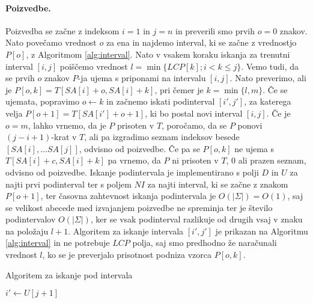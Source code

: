 \paragraph{Poizvedbe.}
Poizvedba se začne z indeksom $i=1$ in $j=n$ in preverili smo prvih $o=0$ znakov. Nato povečamo vrednost $o$ za ena in najdemo interval, ki se začne z vrednostjo $P[o]$, z Algoritmom \ref{alg:interval}. Nato v vsakem koraku iskanja za trenutni interval $[i,j]$ poiščemo vrednost $l=\min\{LCP[k];i<k\le j\}$. Vemo tudi, da se prvih $o$ znakov $P$-ja ujema s priponami na intervalu $[i,j]$. Nato preverimo, ali je $P[o,k]=T[SA[i]+o,SA[i]+k]$, pri čemer je $k=\min\{l,m\}$. Če se ujemata, popravimo $o\leftarrow k$ in začnemo iskati podinterval $[i',j']$, za katerega velja $P[o+1]=T[SA[i']+o+1]$, ki bo postal novi interval $[i,j]$. Če je $o=m$, lahko vrnemo, da je $P$ prisoten v $T$, poročamo, da se $P$ ponovi $(j-i+1)$-krat v $T$, ali pa izgradimo seznam indeksov besede $[SA[i],\dots SA[j]]$, odvisno od poizvedbe. Če pa se $P[o,k]$ ne ujema s $T[SA[i]+c,SA[i]+k]$ pa vrnemo, da $P$ ni prisoten v $T$, 0 ali prazen seznam, odvisno od poizvedbe. Iskanje podintervala je implementirano s polji $D$ in $U$ za najti prvi podinterval ter s poljem $NI$ za najti interval, ki se začne z znakom $P[o+1]$, ter časovna zahtevnost iskanja podintervala je $O(|\Sigma|)=O(1)$, saj se velikost abecede med izvajanjem poizvedbe ne spreminja ter je število podintervalov $O(|\Sigma|)$, ker se vsak podinterval razlikuje od drugih vsaj v znaku na položaju $l+1$. Algoritem za iskanje intervala $[i',j']$ je prikazan na Algoritmu \ref{alg:interval} in ne potrebuje $LCP$ polja, saj smo predhodno že naračunali vrednost $l$, ko se je preverjalo prisotnost podniza vzorca $P[o,k]$. 

\begin{algorithm}[htb]

    \caption{Algoritem za iskanje pod intervala }\label{alg:interval}
    {
                    {$i'\leftarrow U[j+1]$}

            {\Vrni{$[i,i'-1]$}}


                {\Vrni{$[i',j]$}}
        
        {\Vrni{$[-1,-1]$}}    
    }
\end{algorithm}


